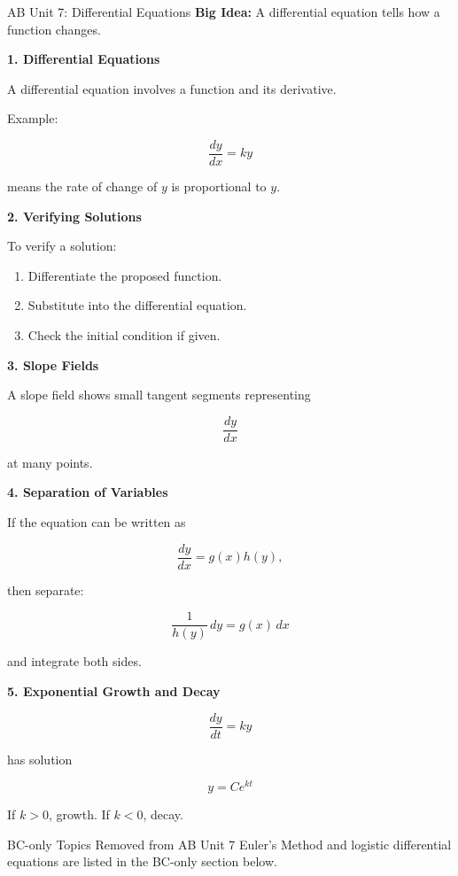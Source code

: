 \documentclass[11pt]{article}
\newcommand{\subtopic}[1]{
\vspace{0.45em}
\textcolor{novelPurpleDark}{\textbf{#1}}
}
\begin{document}
\newpage

\begin{unitbox}{AB Unit 7: Differential Equations}
\textbf{Big Idea:} A differential equation tells how a function changes.
\end{unitbox}

\subtopic{1. Differential Equations}

A differential equation involves a function and its derivative.

Example:

\[
\frac{dy}{dx}=ky
\]

means the rate of change of \(y\) is proportional to \(y\).

\subtopic{2. Verifying Solutions}

To verify a solution:

\begin{enumerate}[leftmargin=1.5em]
\item Differentiate the proposed function.
\item Substitute into the differential equation.
\item Check the initial condition if given.
\end{enumerate}

\subtopic{3. Slope Fields}

A slope field shows small tangent segments representing

\[
\frac{dy}{dx}
\]

at many points.

\subtopic{4. Separation of Variables}

If the equation can be written as

\[
\frac{dy}{dx}=g(x)h(y),
\]

then separate:

\[
\frac{1}{h(y)}\,dy=g(x)\,dx
\]

and integrate both sides.

\subtopic{5. Exponential Growth and Decay}

\[
\frac{dy}{dt}=ky
\]

has solution

\[
y=Ce^{kt}
\]

If \(k>0\), growth.  
If \(k<0\), decay.

\begin{warningbox}{BC-only Topics Removed from AB Unit 7}
Euler's Method and logistic differential equations are listed in the BC-only section below.
\end{warningbox}
\end{document}
